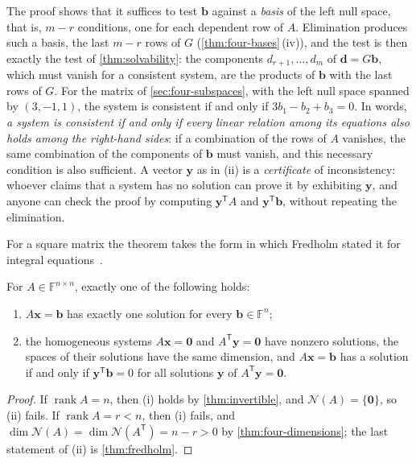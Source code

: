 The proof shows that it suffices to test $\mathbf b$ against a \emph{basis} of the left null space, that is, $m-r$ conditions, one for each dependent row of $A$. Elimination produces such a basis, the last $m-r$ rows of $G$ (\cref{thm:four-bases}\,(iv)), and the test is then exactly the test of \cref{thm:solvability}: the components $d_{r+1},\ldots,d_m$ of $\mathbf d=G\mathbf b$, which must vanish for a consistent system, are the products of $\mathbf b$ with the last rows of $G$. For the matrix of \cref{sec:four-subspaces}, with the left null space spanned by $(3,-1,1)$, the system is consistent if and only if $3b_1-b_2+b_3=0$. In words, \emph{a system is consistent if and only if every linear relation among its equations also holds among the right-hand sides}: if a combination of the rows of $A$ vanishes, the same combination of the components of $\mathbf b$ must vanish, and this necessary condition is also sufficient. A vector $\mathbf y$ as in (ii) is a \emph{certificate} of inconsistency: whoever claims that a system has no solution can prove it by exhibiting $\mathbf y$, and anyone can check the proof by computing $\mathbf y^{\mathsf T}A$ and $\mathbf y^{\mathsf T}\mathbf b$, without repeating the elimination.

For a square matrix the theorem takes the form in which Fredholm stated it for integral equations~\cite{fredholm1903}.

\begin{corollary}
\label{cor:fredholm-square}
For $A\in\mathbb F^{n\times n}$, exactly one of the following holds:
\begin{enumerate}
\item $A\mathbf x=\mathbf b$ has exactly one solution for every $\mathbf b\in\mathbb F^n$;
\item the homogeneous systems $A\mathbf x=\mathbf 0$ and $A^{\mathsf T}\mathbf y=\mathbf 0$ have nonzero solutions, the spaces of their solutions have the same dimension, and $A\mathbf x=\mathbf b$ has a solution if and only if $\mathbf y^{\mathsf T}\mathbf b=0$ for all solutions $\mathbf y$ of $A^{\mathsf T}\mathbf y=\mathbf 0$.
\end{enumerate}
\end{corollary}

\begin{proof}
If $\operatorname{rank}A=n$, then (i) holds by \cref{thm:invertible}, and $\mathcal N(A)=\{\mathbf 0\}$, so (ii) fails. If $\operatorname{rank}A=r<n$, then (i) fails, and $\dim\mathcal N(A)=\dim\mathcal N(A^{\mathsf T})=n-r>0$ by \cref{thm:four-dimensions}; the last statement of (ii) is \cref{thm:fredholm}.
\end{proof}

